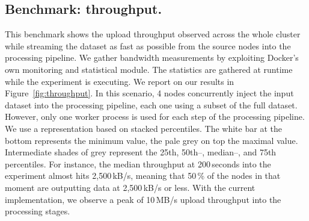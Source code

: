 \subsection{Benchmark: throughput.}
This benchmark shows the upload throughput observed across the whole cluster while streaming the dataset as fast as possible from the source nodes into the processing pipeline.
We gather bandwidth measurements by exploiting Docker's own monitoring and statistical module.
The statistics are gathered at runtime while the experiment is executing.
We report on our results in Figure~\ref{fig:throughput}.
In this scenario, 4 nodes concurrently inject the input dataset into the processing pipeline, each one using a subset of the full dataset.
However, only one worker process is used for each step of the processing pipeline.
We use a representation based on stacked percentiles.
The white bar at the bottom represents the minimum value, the pale grey on top the maximal value.
Intermediate shades of grey represent the 25th, 50th–, median–, and 75th percentiles.
For instance, the median throughput at 200\,seconds into the experiment almost hits 2,500\,kB/s, meaning that 50\,\% of the nodes in that moment are outputting data at 2,500\,kB/s or less.
With the current implementation, we observe a peak of 10\,MB/s upload throughput into the processing stages.%




